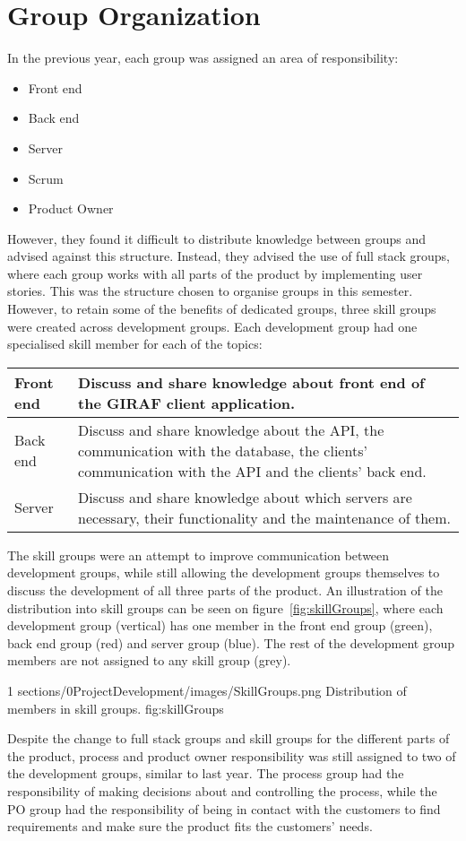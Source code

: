 \section{Group Organization}
In the previous year, each group was assigned an area of responsibility:
\begin{itemize}
    \item Front end
    \item Back end
    \item Server
    \item Scrum
    \item Product Owner
\end{itemize}

However, they found it difficult to distribute knowledge between groups and advised against this structure. Instead, they advised the use of full stack groups, where each group works with all parts of the product by implementing user stories. This was the structure chosen to organise groups in this semester. However, to retain some of the benefits of dedicated groups, three skill groups were created across development groups. Each development group had one specialised skill member for each of the topics: 

\begin{table}[H]
\begin{tabularx}{\textwidth}{l|X}
\hline
 Front end  & Discuss and share knowledge about front end of the GIRAF client application.  \\ \hline
 Back end   & Discuss and share knowledge about the API, the communication with the database, the clients' communication with the API and the clients' back end.   \\ \hline
 Server     & Discuss and share knowledge about which servers are necessary, their functionality and the maintenance of them.\\ \hline
\end{tabularx}
\end{table}

The skill groups were an attempt to improve communication between development groups, while still allowing the development groups themselves to discuss the development of all three parts of the product. An illustration of the distribution into skill groups can be seen on figure~\ref{fig:skillGroups}, where each development group (vertical) has one member in the front end group (green), back end group (red) and server group (blue). The rest of the development group members are not assigned to any skill group (grey).

        {1} %
        {sections/0ProjectDevelopment/images/SkillGroups.png} %
        {Distribution of members in skill groups.} %
        {fig:skillGroups} %

Despite the change to full stack groups and skill groups for the different parts of the product, process and product owner responsibility was still assigned to two of the development groups, similar to last year. The process group had the responsibility of making decisions about and controlling the process, while the PO group had the responsibility of being in contact with the customers to find requirements and make sure the product fits the customers' needs.
